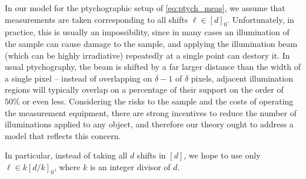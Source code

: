 In our model for the ptychographic setup of \eqref{eq:ptych_meas}, we assume that measurements are taken corresponding to all shifts $\ell \in [d]_0$.  Unfortunately, in practice, this is usually an impossibility, since in many cases an illumination of the sample can cause damage to the sample, and applying the illumination beam (which can be highly irradiative) repeatedly at a single point can destory it.  In usual ptychography, the beam is shifted by a far larger distance than the width of a single pixel -- instead of overlapping on $\delta - 1$ of $\delta$ pixels, adjacent illumination regions will typically overlap on a percentage of their support on the order of $50\%$ or even less.  Considering the risks to the sample and the costs of operating the measurement equipment, there are strong incentives to reduce the number of illuminations applied to any object, and therefore our theory ought to address a model that reflects this concern.

In particular, instead of taking all $d$ shifts in $[d]$, we hope to use only $\ell \in k [d / k]_0$, where $k$ is an integer divisor of $d$.
